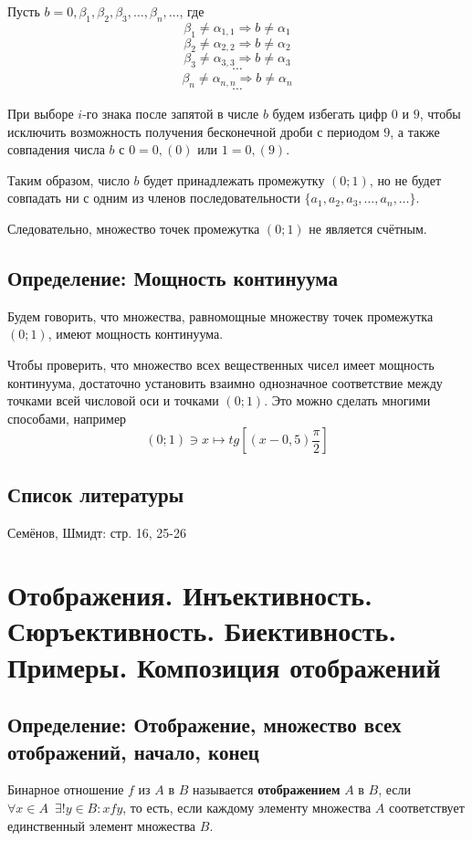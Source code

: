 \documentclass{article}
\begin{document}
Пусть $b = 0, \beta_1, \beta_2, \beta_3, \dots, \beta_n, \dots$, где \[
	\beta_1 \neq \alpha_{1, 1} \Rightarrow b \neq \alpha_1 \]\[
	\beta_2 \neq \alpha_{2, 2} \Rightarrow b \neq \alpha_2 \]\[
	\beta_3 \neq \alpha_{3, 3} \Rightarrow b \neq \alpha_3 \]\[
	\cdots \]\[
	\beta_n \neq \alpha_{n, n} \Rightarrow b \neq \alpha_n \]\[
	\cdots \]

При выборе $i$-го знака после запятой в числе $b$ будем избегать цифр $0$ и $9$, чтобы исключить возможность получения бесконечной дроби с периодом $9$, а также совпадения числа $b$ с $0 = 0,(0)$ или $1 = 0,(9)$.

Таким образом, число $b$ будет принадлежать промежутку $(0; 1)$, но не будет совпадать ни с одним из членов последовательности $\{a_1, a_2, a_3, \dots, a_n, \dots \}$.

Следовательно, множество точек промежутка $(0; 1)$ не является счётным.

\subsection{Определение: Мощность континуума}
Будем говорить, что множества, равномощные множеству точек промежутка $(0; 1)$, имеют мощность континуума.

Чтобы проверить, что множество всех вещественных чисел имеет мощность континуума, достаточно установить взаимно однозначное соответствие между точками всей числовой оси и точками $(0; 1)$. Это можно сделать многими способами, например \[ (0; 1) \ni x \mapsto tg[(x - 0,5)\frac{\pi}{2}] \]	

\subsection*{Список литературы}
Семёнов, Шмидт: стр. 16, 25-26

\newpage
\section{Отображения. Инъективность. Сюръективность. Биективность. Примеры. Композиция отображений}
\subsection{Определение: Отображение, множество всех отображений, начало, конец}
Бинарное отношение $f$ из $A$ в $B$ называется \textbf{отображением} $A$ в $B$, если ${\forall x \in A \enspace \exists!y \in B : xfy}$, то есть, если каждому элементу множества $A$ соответствует единственный элемент множества $B$.
\end{document}
